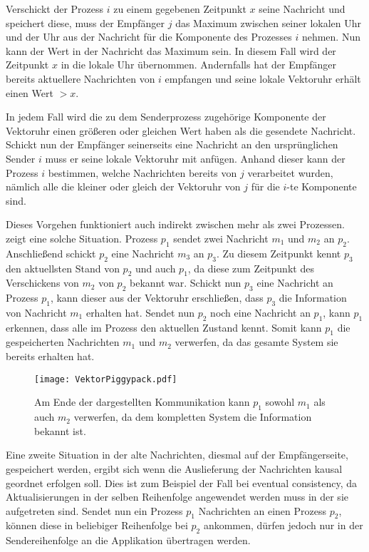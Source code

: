 Verschickt der Prozess $i$ zu einem gegebenen Zeitpunkt $x$ seine Nachricht und speichert diese, muss der Empfänger $j$ das Maximum zwischen seiner lokalen Uhr und der Uhr aus der Nachricht für die Komponente des Prozesses $i$ nehmen.
Nun kann der Wert in der Nachricht das Maximum sein.
In diesem Fall wird der Zeitpunkt $x$ in die lokale Uhr übernommen.
Andernfalls hat der Empfänger bereits aktuellere Nachrichten von $i$ empfangen und seine lokale Vektoruhr erhält einen Wert $>x$.

In jedem Fall wird die zu dem Senderprozess zugehörige Komponente der Vektoruhr einen größeren oder gleichen Wert haben als die gesendete Nachricht.
Schickt nun der Empfänger seinerseits eine Nachricht an den ursprünglichen Sender $i$ muss er seine lokale Vektoruhr mit anfügen.
Anhand dieser kann der Prozess $i$ bestimmen, welche Nachrichten bereits von $j$ verarbeitet wurden, nämlich alle die kleiner oder gleich der Vektoruhr von $j$ für die $i$-te Komponente sind.

Dieses Vorgehen funktioniert auch indirekt zwischen mehr als zwei Prozessen.
 zeigt eine solche Situation.
Prozess $p_1$ sendet zwei Nachricht $m_1$ und $m_2$ an $p_2$.
Anschließend schickt $p_2$ eine Nachricht $m_3$ an $p_3$.
Zu diesem Zeitpunkt kennt $p_3$ den aktuellsten Stand von $p_2$ und auch $p_1$, da diese zum Zeitpunkt des Verschickens von $m_2$ von $p_2$ bekannt war.
Schickt nun $p_3$ eine Nachricht an Prozess $p_1$, kann dieser aus der Vektoruhr erschließen, dass $p_3$ die Information von Nachricht $m_1$ erhalten hat.
Sendet nun $p_2$ noch eine Nachricht an $p_1$, kann $p_1$ erkennen, dass alle im Prozess den aktuellen Zustand kennt.
Somit kann $p_1$ die gespeicherten Nachrichten $m_1$ und $m_2$ verwerfen, da das gesamte System sie bereits erhalten hat.

\begin{figure}[ht]
    \centering
    \texttt{[image: VektorPiggypack.pdf]}
    \caption[Löschen alter Nachrichten]{Am Ende der dargestellten Kommunikation kann  $p_1$ sowohl $m_1$ als auch $m_2$ verwerfen, da dem kompletten System die Information bekannt ist.}
    \label{fig:vectorPiggyback}
\end{figure} 

Eine zweite Situation in der alte Nachrichten, diesmal auf der Empfängerseite, gespeichert werden, ergibt sich wenn die Auslieferung der Nachrichten kausal geordnet erfolgen soll.
Dies ist zum Beispiel der Fall bei eventual consistency, da Aktualisierungen in der selben Reihenfolge angewendet werden muss in der sie aufgetreten sind.
Sendet nun ein Prozess $p_1$ Nachrichten an einen Prozess $p_2$, können diese in beliebiger Reihenfolge bei $p_2$ ankommen, dürfen jedoch nur in der Sendereihenfolge an die Applikation übertragen werden.

